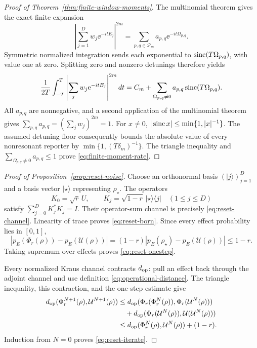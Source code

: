 \begin{proof}[Proof of Theorem~\ref{thm:finite-window-moments}]
The multinomial theorem gives the exact finite expansion
\begin{equation}
 \left|\sum_{j=1}^{D}w_j\ee^{-itE_j}\right|^{2m}
 =\sum_{p,q\in\mathcal P_m}a_{p,q}\ee^{-it\Omega_{p,q}}.
                                                        \label{eq:replica-expansion-proof}
\end{equation}
Symmetric normalized integration sends each exponential to
$\operatorname{sinc}(T\Omega_{p,q})$, with value one at zero.  Splitting zero and nonzero
detunings therefore yields
\begin{equation}
 \frac1{2T}\int_{-T}^{T}
 \left|\sum_jw_j\mathrm e^{-itE_j}\right|^{2m}dt
 =C_m+\sum_{\Omega_{p,q}\ne0}
 a_{p,q}\operatorname{sinc}(T\Omega_{p,q}).                       \label{eq:replica-sinc-proof}
\end{equation}
All $a_{p,q}$ are nonnegative, and a second application of the multinomial
theorem gives
$\sum_{p,q}a_{p,q}=(\sum_jw_j)^{2m}=1$.  For $x\ne0$,
$|\operatorname{sinc} x|\le\min\{1,|x|^{-1}\}$.  The assumed detuning floor consequently
bounds the absolute value of every nonresonant reporter by
$\min\{1,(T\delta_m)^{-1}\}$.  The triangle inequality and
$\sum_{\Omega_{p,q}\ne0}a_{p,q}\le1$ prove
\eqref{eq:finite-moment-rate}.
\end{proof}

\begin{proof}[Proof of Proposition~\ref{prop:reset-noise}]
Choose an orthonormal basis $(|j\rangle)_{j=1}^{D}$ and a basis vector
$|\star\rangle$ representing $\rho_\star$.  The operators
\begin{equation}
 K_0=\sqrt r\,U,\qquad
 K_j=\sqrt{1-r}\,|\star\rangle\!\langle j|
 \quad(1\le j\le D)                                 \label{eq:reset-kraus-proof}
\end{equation}
satisfy $\sum_{j=0}^{D}K_j^*K_j=I$.  Their operator-sum channel is precisely
\eqref{eq:reset-channel}.  Linearity of trace proves
\eqref{eq:reset-born}.  Since every effect probability lies in $[0,1]$,
\begin{equation}
 |p_E(\Phi_r(\rho))-p_E(\mathcal U(\rho))|
 =(1-r)|p_E(\rho_\star)-p_E(\mathcal U(\rho))|
 \le1-r.
\end{equation}
Taking supremum over effects proves \eqref{eq:reset-onestep}.

Every normalized Kraus channel contracts $d_{\rm op}$: pull an effect back
through the adjoint channel and use definition
\eqref{eq:operational-distance}.  The triangle inequality, this contraction,
and the one-step estimate give
\begin{align*}
 d_{\rm op}(\Phi_r^{N+1}(\rho),\mathcal U^{N+1}(\rho))
 &\le d_{\rm op}(\Phi_r(\Phi_r^N(\rho)),
                  \Phi_r(\mathcal U^N(\rho)))\\
 &\quad+d_{\rm op}(\Phi_r(\mathcal U^N(\rho)),
                    \mathcal U(\mathcal U^N(\rho)))\\
 &\le d_{\rm op}(\Phi_r^N(\rho),\mathcal U^N(\rho))+(1-r).
\end{align*}
Induction from $N=0$ proves \eqref{eq:reset-iterate}.
\end{proof}

